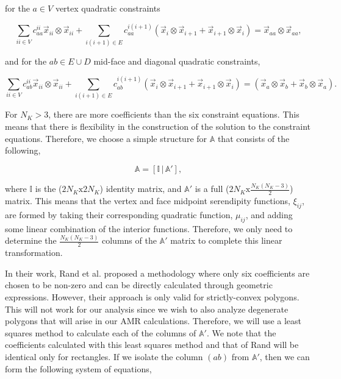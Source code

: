 \documentclass[preprint,10pt]{elsarticle}
\begin{document}
\noindent for the $a\in V$ vertex quadratic constraints

\begin{equation}
\label{eq::BF_Amat_quad_vert_constraints}
\sum_{ii \in V} c_{aa}^{ii} \vec{x}_{ii} \otimes \vec{x}_{ii} + \sum_{i(i+1) \in E}  c_{aa}^{i(i+1)} \left( \vec{x}_i \otimes \vec{x}_{i+1} + \vec{x}_{i+1} \otimes \vec{x}_i \right) = \vec{x}_{aa} \otimes \vec{x}_{aa}, 
\end{equation}

\noindent and for the $ab \in E \cup D$ mid-face and diagonal quadratic constraints,

\begin{equation}
\label{eq::BF_Amat_quad_facediag_constraints}
\sum_{ii \in V} c_{ab}^{ii} \vec{x}_{ii} \otimes \vec{x}_{ii} + \sum_{i(i+1) \in E}  c_{ab}^{i(i+1)} \left( \vec{x}_i \otimes \vec{x}_{i+1} + \vec{x}_{i+1} \otimes \vec{x}_i \right) = \left( \vec{x}_a \otimes \vec{x}_{b} + \vec{x}_{b} \otimes \vec{x}_a \right).
\end{equation}

\noindent For $N_K > 3$, there are more coefficients than the six constraint equations. This means that there is flexibility in the construction of the solution to the constraint equations. Therefore, we choose a simple structure for $\mathbb{A}$ that consists of the following,


\begin{equation}
\label{eq::BF_quad_Amat_simple}
\mathbb{A} = \left[ \mathbb{I} \, | \, \mathbb{A}' \right],
\end{equation}

\noindent where $\mathbb{I}$ is the ($2 N_K \text{x} 2 N_K$) identity matrix, and $\mathbb{A}'$ is a full ($2 N_K \text{x}  \frac{N_K(N_K-3)}{2}$) matrix. This means that the vertex and face midpoint serendipity functions, $\xi_{ij}$, are formed by taking their corresponding quadratic function, $\mu_{ij}$, and adding some linear combination of the interior functions. Therefore, we only need to determine the $\frac{N_K(N_K-3)}{2}$ columns of the $\mathbb{A}'$ matrix to complete this linear transformation. 

In their work, Rand et al. proposed a methodology where only six coefficients are chosen to be non-zero and can be directly calculated through geometric expressions. However, their approach is only valid for strictly-convex polygons. This will not work for our analysis since we wish to also analyze degenerate polygons that will arise in our AMR calculations. Therefore, we will use a least squares method to calculate each of the columns of $\mathbb{A}'$. We note that the coefficients calculated with this least squares method and that of Rand will be identical only for rectangles. If we isolate the column $(ab)$ from $\mathbb{A}'$, then we can form the following system of equations, 
\end{document}
